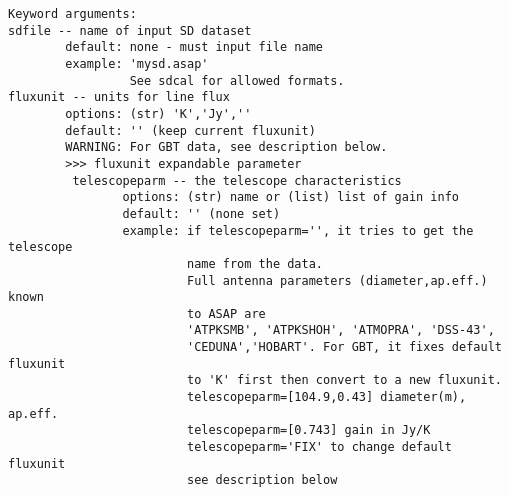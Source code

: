 \begin{verbatim}
Keyword arguments:
sdfile -- name of input SD dataset
        default: none - must input file name
        example: 'mysd.asap'
                 See sdcal for allowed formats.
fluxunit -- units for line flux
        options: (str) 'K','Jy',''
        default: '' (keep current fluxunit)
        WARNING: For GBT data, see description below.
        >>> fluxunit expandable parameter
         telescopeparm -- the telescope characteristics
                options: (str) name or (list) list of gain info
                default: '' (none set)
                example: if telescopeparm='', it tries to get the telescope
                         name from the data.
                         Full antenna parameters (diameter,ap.eff.) known
                         to ASAP are
                         'ATPKSMB', 'ATPKSHOH', 'ATMOPRA', 'DSS-43',
                         'CEDUNA','HOBART'. For GBT, it fixes default fluxunit
                         to 'K' first then convert to a new fluxunit.
                         telescopeparm=[104.9,0.43] diameter(m), ap.eff.
                         telescopeparm=[0.743] gain in Jy/K
                         telescopeparm='FIX' to change default fluxunit
                         see description below


\end{verbatim}
